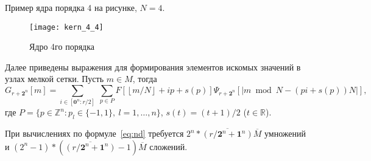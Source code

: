 

Пример ядра порядка 4 на рисунке, $N=4$.

\begin{figure}[h!]
  \centering
  \texttt{[image: kern\_4\_4]} 
  \caption{Ядро 4го порядка}
  \label{fig:reg_net}
\end{figure}
\FloatBarrier


 Далее приведены выражения для формирования
 элементов искомых значений в узлах мелкой сетки.
Пусть $m\in M$, тогда
\begin{equation}
  \label{eq:nd}
    G_{r+\mathbf{2}^n}[m] = 
    \sum_{i \in  [\mathbf{0}^n:r/2]}\ \sum_{p\in P} 
        F \left[ \left \lfloor {m}/{N} \right \rfloor + ip + s(p)\right]
      \Psi_{r+\mathbf{2}^n}[|m\bmod N - (pi + s(p))N|],
\end{equation}
где $P=\{p\in\mathbb{Z}^n: p_l\in\{-1,1\},\ l=1,\ldots,n\}$, $s(t)=(t+1)/2$
($t\in\mathbb{R}$).


При вычислениях по формуле~\eqref{eq:nd} требуется
$2^n * \overline{(r/\mathbf{2}^n+\mathbf{1}^n)} \overline{M}$
умножений и
$(2^n-1) * (\overline{(r/\mathbf{2}^n+\mathbf{1}^n)} -1)  \overline{M}$
сложений. 




